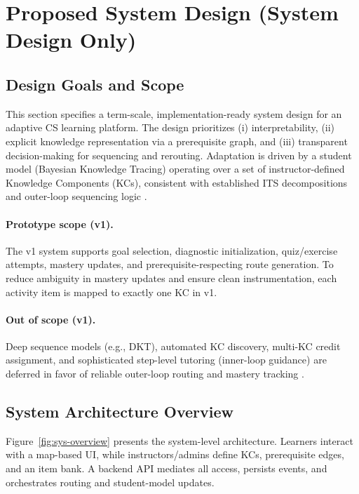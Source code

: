 \documentclass{article}
\begin{document}


\section{Proposed System Design (System Design Only)}
\label{sec:system-design}

\subsection{Design Goals and Scope}
This section specifies a term-scale, implementation-ready system design for an adaptive CS learning
platform. The design prioritizes (i) interpretability, (ii) explicit knowledge representation via a
prerequisite graph, and (iii) transparent decision-making for sequencing and rerouting. Adaptation is
driven by a student model (Bayesian Knowledge Tracing) operating over a set of instructor-defined
Knowledge Components (KCs), consistent with established ITS decompositions and outer-loop sequencing
logic \cite{woolf2009,vanlehn2006,corbett1995}.

\paragraph{Prototype scope (v1).}
The v1 system supports goal selection, diagnostic initialization, quiz/exercise attempts, mastery updates,
and prerequisite-respecting route generation. To reduce ambiguity in mastery updates and ensure clean
instrumentation, each activity item is mapped to exactly one KC in v1.

\paragraph{Out of scope (v1).}
Deep sequence models (e.g., DKT), automated KC discovery, multi-KC credit assignment, and sophisticated
step-level tutoring (inner-loop guidance) are deferred in favor of reliable outer-loop routing and
mastery tracking \cite{piech2015dkt,vanlehn2006}.

\FloatBarrier

\subsection{System Architecture Overview}
Figure~\ref{fig:sys-overview} presents the system-level architecture. Learners interact with a map-based UI,
while instructors/admins define KCs, prerequisite edges, and an item bank. A backend API mediates all access,
persists events, and orchestrates routing and student-model updates.
\end{document}
